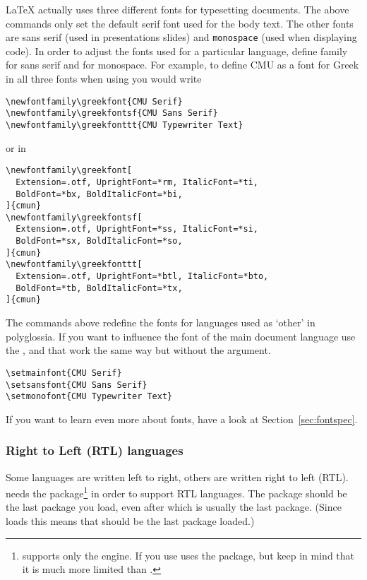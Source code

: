 \LaTeX{} actually uses three different fonts for typesetting documents. The
above commands only set the default serif font used for the body text. The
other fonts are \textsf{sans serif} (used in presentations slides) and
\texttt{monospace} (used when displaying code). In order to adjust the fonts used for
a particular language, define  family for sans serif and
 for monospace. For example, to define CMU as a
font for Greek in all three fonts when using  you would write
\begin{verbatim}
\newfontfamily\greekfont{CMU Serif}
\newfontfamily\greekfontsf{CMU Sans Serif}
\newfontfamily\greekfonttt{CMU Typewriter Text}
\end{verbatim}
\pagebreak[3]
or in 
\begin{verbatim}
\newfontfamily\greekfont[
  Extension=.otf, UprightFont=*rm, ItalicFont=*ti,
  BoldFont=*bx, BoldItalicFont=*bi,
]{cmun}
\newfontfamily\greekfontsf[
  Extension=.otf, UprightFont=*ss, ItalicFont=*si,
  BoldFont=*sx, BoldItalicFont=*so, 
]{cmun}
\newfontfamily\greekfonttt[
  Extension=.otf, UprightFont=*btl, ItalicFont=*bto,
  BoldFont=*tb, BoldItalicFont=*tx, 
]{cmun}
\end{verbatim}

The commands above redefine the fonts for languages used as \enquote*{other} in
polyglossia. If you want to influence the font of the main document language
use the ,  and  that work the
same way but without the  argument.
\begin{verbatim}
\setmainfont{CMU Serif}
\setsansfont{CMU Sans Serif}
\setmonofont{CMU Typewriter Text}
\end{verbatim}

If you want to learn even more about fonts, have a look at
Section~\ref{sec:fontspec}.

\subsubsection{Right to Left (RTL) languages}

Some languages are written left to right, others are written right to left
(RTL).  needs the  package\footnote{
  supports only the  engine. If you use 
   uses the  package, but keep in mind that it is
  much more limited than .} in order to support RTL languages. The
 package should be the last package you load, even after
 which is usually the last package. (Since 
loads  this means that  should be the last package
loaded.)

